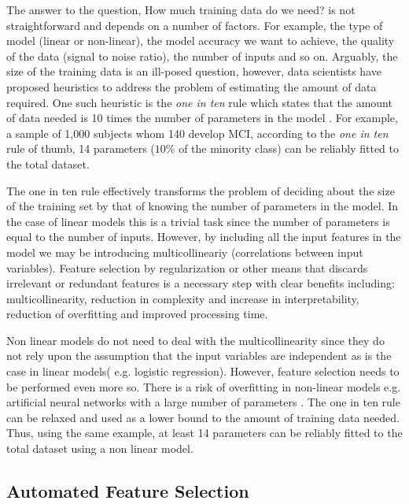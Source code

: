 \documentclass[preprint,12pt]{elsarticle}
\begin{document}
The answer to the question, How much training data do we need? is not straightforward and depends on a number of factors. For example, the type of model (linear or non-linear), the model accuracy we want to achieve, the quality of the data (signal to noise ratio), the number of inputs and so on.  
Arguably, the size of the training data is an ill-posed question, however, data scientists have proposed heuristics to address the problem of estimating the amount of data required. One such heuristic is the \emph{one in ten} rule which states that the amount of data needed is 10 times the number of parameters in the model \cite{harrell2001reg}. 
For example, a sample of 1,000 subjects whom 140 develop MCI, according to the \emph{one in ten} rule of thumb, 14 parameters ($10\%$ of the minority class) can be reliably fitted to the total dataset. 

The one in ten rule effectively transforms the problem of deciding about the size of the training set by that of knowing the number of parameters in the model. In the case of linear models this is a trivial task since the number of parameters is equal to the number of inputs. However, by including all the input features in the model we may be introducing multicollineariy (correlations between input variables). 
Feature selection by regularization or other means that discards irrelevant or redundant features is a necessary step with clear benefits including: multicollinearity, reduction in complexity and increase in interpretability, reduction of overfitting and improved processing time.

Non linear models do not need to deal with the multicollinearity since they do not rely upon the assumption that the input variables are independent as is the case in linear models( e.g. logistic regression). However, feature selection needs to be performed even more so. There is a risk of overfitting in non-linear models e.g. artificial neural networks with a large number of parameters \cite{goodfellow2016deep}. The one in ten rule can be relaxed and used as a lower bound to the amount of training data needed. Thus, using the same example, at least 14 parameters can be reliably fitted to the total dataset using a non linear model.

\subsection{Automated Feature Selection}
\end{document}
